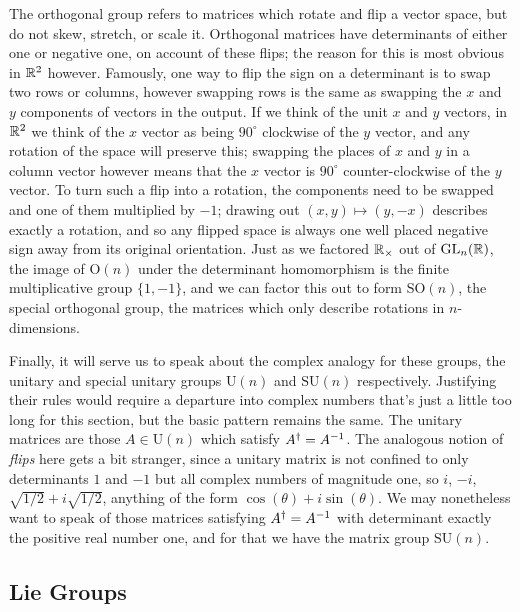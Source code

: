 \documentclass[11pt]{article}
\begin{document}
The orthogonal group refers to matrices which rotate and flip a vector space, but do not skew, stretch, or scale it. Orthogonal matrices have determinants of either one or negative one, on account of these flips; the reason for this is most obvious in $\mathbb{R}^2$ however. Famously, one way to flip the sign on a determinant is to swap two rows or columns, however swapping rows is the same as swapping the $x$ and $y$ components of vectors in the output. If we think of the unit $x$ and $y$ vectors, in $\mathbb{R}^2$ we think of the $x$ vector as being $90^\circ$ clockwise of the $y$ vector, and any rotation of the space will preserve this; swapping the places of $x$ and $y$ in a column vector however means that the $x$ vector is $90^\circ$ counter-clockwise of the $y$ vector. To turn such a flip into a rotation, the components need to be swapped and one of them multiplied by $-1$; drawing out $(x,y) \mapsto (y,-x)$ describes exactly a rotation, and so any flipped space is always one well placed negative sign away from its original orientation. Just as we factored $\mathbb{R}_\times$ out of $\mathrm{GL}_n(\mathbb{R})$, the image of $\mathrm{O}(n)$ under the determinant homomorphism is the finite multiplicative group $\{1,-1\}$, and we can factor this out to form $\mathrm{SO}(n)$, the special orthogonal group, the matrices which only describe rotations in $n$-dimensions.

Finally, it will serve us to speak about the complex analogy for these groups, the unitary and special unitary groups $\mathrm{U}(n)$ and $\mathrm{SU}(n)$ respectively. Justifying their rules would require a departure into complex numbers that's just a little too long for this section, but the basic pattern remains the same. The unitary matrices are those $A \in \mathrm{U}(n)$ which satisfy $A^\dagger = A^{-1}$. The analogous notion of \emph{flips} here gets a bit stranger, since a unitary matrix is not confined to only determinants $1$ and $-1$ but all complex numbers of magnitude one, so $i$, $-i$, $\sqrt{1/2} + i\sqrt{1/2}$, anything of the form $\cos(\theta) + i\sin(\theta)$. We may nonetheless want to speak of those matrices satisfying $A^\dagger = A^{-1}$ with determinant exactly the positive real number one, and for that we have the matrix group $\mathrm{SU}(n)$.

\subsection{Lie Groups}
\end{document}
